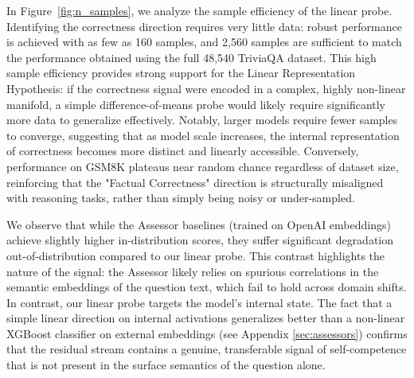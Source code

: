 \documentclass{article} %
\begin{document}
In Figure~\ref{fig:n_samples}, we analyze the sample efficiency of the linear probe. Identifying the correctness direction requires very little data: robust performance is achieved with as few as 160 samples, and 2,560 samples are sufficient to match the performance obtained using the full 48,540 TriviaQA dataset. This high sample efficiency provides strong support for the Linear Representation Hypothesis: if the correctness signal were encoded in a complex, highly non-linear manifold, a simple difference-of-means probe would likely require significantly more data to generalize effectively. Notably, larger models require fewer samples to converge, suggesting that as model scale increases, the internal representation of correctness becomes more distinct and linearly accessible. Conversely, performance on GSM8K plateaus near random chance regardless of dataset size, reinforcing that the "Factual Correctness" direction is structurally misaligned with reasoning tasks, rather than simply being noisy or under-sampled.

We observe that while the Assessor baselines (trained on OpenAI embeddings) achieve slightly higher in-distribution scores, they suffer significant degradation out-of-distribution compared to our linear probe. This contrast highlights the nature of the signal: the Assessor likely relies on spurious correlations in the semantic embeddings of the question text, which fail to hold across domain shifts. In contrast, our linear probe targets the model's internal state. The fact that a simple linear direction on internal activations generalizes better than a non-linear XGBoost classifier on external embeddings (see Appendix \ref{sec:assessors}) confirms that the residual stream contains a genuine, transferable signal of self-competence that is not present in the surface semantics of the question alone.


\end{document}

